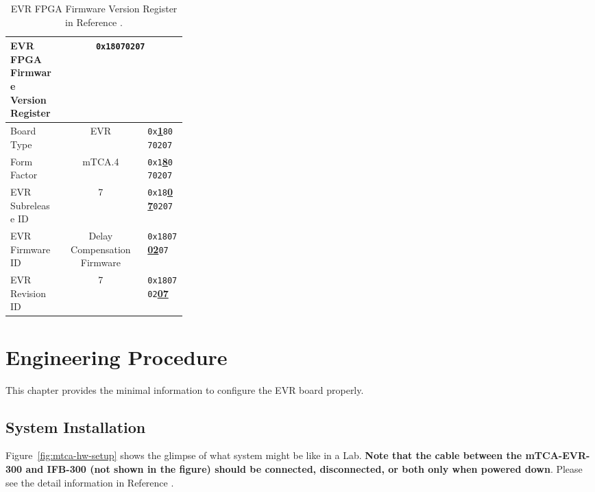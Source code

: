 \documentclass[11pt
  , a4paper
  , article
  , oneside
  , showtrims
]{memoir}
\begin{document}
\begin{table}[!htb]
  \centering
  \begin{tabular}{p{0.3\linewidth}|c|l}
    \toprule
    EVR FPGA Firmware Version Register              & \multicolumn{2}{c}{\texttt{0x18070207}}             \\\midrule
    Board Type        & EVR                         &  \texttt{0x}\underline{\textbf{1}}\texttt{8070207}  \\\midrule
    Form Factor       & mTCA.4                      &  \texttt{0x1}\underline{\textbf{8}}\texttt{070207}  \\\midrule
    EVR Subrelease ID & 7                           &  \texttt{0x18}\underline{\textbf{07}}\texttt{0207}  \\\midrule
    EVR Firmware ID   & Delay Compensation Firmware &  \texttt{0x1807}\underline{\textbf{02}}\texttt{07}  \\\midrule
    EVR Revision ID   & 7                           &  \texttt{0x180702}\underline{\textbf{07}}           \\\bottomrule
  \end{tabular}
  \caption[]{EVR FPGA Firmware Version Register in Reference \citep[see][p66]{MRFEVENTSYSTEMDC}.}
  \label{table:fwinfo}
\end{table}



\clearpage
\chapter{Engineering Procedure}
This chapter provides the minimal information to configure the EVR board properly.


\section{System Installation}
Figure~\ref{fig:mtca-hw-setup} shows the glimpse of what system might be like in a Lab. \textbf{Note that the cable between the mTCA-EVR-300 and IFB-300 (not shown in the figure) should be connected, disconnected, or both only when powered down}. Please see the detail information in Reference \citep[][p54]{MRFEVENTSYSTEMDC}.
\end{document}
